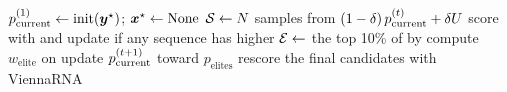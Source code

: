 \begin{algorithm}[!b]
\caption{EliteDesign}
\label{alg:elite}
\begin{algorithmic}[1]
\State $p_{\mathrm{current}}^{(1)}\gets\text{init}(\boldsymbol{{y}}^\star)$; \quad $\boldsymbol{{x}}^\star\gets\text{None}$
    \State $\mathcal{S}\gets N$ samples from $(1-\delta)\,p_{\mathrm{current}}^{(t)}+\delta U$
    \State score \SAMPLES with \frank and \fweight
    \State update \vecxstar if any sequence has higher \frank
    \State $\mathcal{E}\gets$ the top 10\% of \SAMPLES by \frank
    \State compute $w_{\mathrm{elite}}$ on \ELITES {}
    \State update $p_{\mathrm{current}}^{(t+1)}$ toward $p_{\mathrm{elites}}$ 
\EndFor
\State rescore the final candidates with ViennaRNA
\State \Return \vecxstar
\EndFunction
\end{algorithmic}
\end{algorithm}
